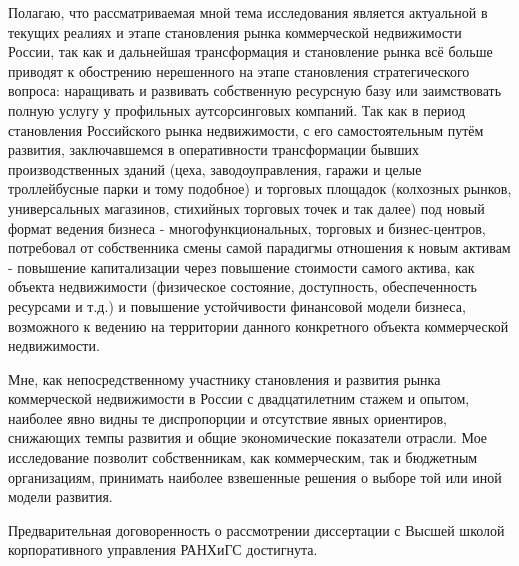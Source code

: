 Полагаю, что рассматриваемая мной тема исследования является актуальной в текущих реалиях и этапе становления рынка коммерческой недвижимости России, так как и дальнейшая трансформация и становление рынка всё больше приводят к обострению нерешенного на этапе становления стратегического вопроса: наращивать и развивать собственную ресурсную базу или заимствовать полную услугу у профильных аутсорсинговых компаний. Так как в период становления Российского рынка недвижимости, с его самостоятельным путём развития, заключавшемся в оперативности трансформации бывших производственных зданий (цеха, заводоуправления, гаражи и целые троллейбусные парки и тому подобное) и торговых площадок (колхозных рынков, универсальных магазинов, стихийных торговых точек и так далее) под новый формат ведения бизнеса - многофункциональных, торговых и бизнес-центров, потребовал от собственника смены самой парадигмы отношения к новым активам - повышение капитализации через повышение стоимости самого актива, как объекта недвижимости (физическое состояние, доступность, обеспеченность ресурсами и т.д.) и повышение устойчивости финансовой модели бизнеса, возможного к ведению на территории данного конкретного объекта коммерческой недвижимости.

Мне, как непосредственному участнику становления и развития рынка коммерческой недвижимости в России с двадцатилетним стажем и опытом, наиболее явно видны те диспропорции и отсутствие явных ориентиров, снижающих темпы развития и общие экономические показатели отрасли. Мое исследование позволит собственникам, как коммерческим, так и бюджетным организациям, принимать наиболее взвешенные решения о выборе той или иной модели развития.

Предварительная договоренность о рассмотрении диссертации с Высшей школой корпоративного управления РАНХиГС достигнута.